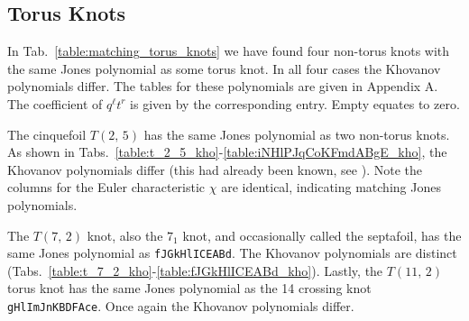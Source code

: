 \documentclass{article}
\theoremstyle{plain}
\begin{document}
        \subsection{Torus Knots}
        \begin{table}[H]
            \centering
            \caption{Knots whose Jones polynomial matches that of a Torus Knot}
            \label{table:matching_torus_knots}
        \end{table}
        In Tab.~\ref{table:matching_torus_knots}
        we have found four non-torus knots with the same
        Jones polynomial as some torus knot. In all four cases the Khovanov
        polynomials differ. The tables for these polynomials are given
        in Appendix A.
        The coefficient of $q^{\ell}t^{r}$ is given by the corresponding entry.
        Empty equates to zero.
        \par\hfill\par
        The cinquefoil $T(2,\,5)$ has the same Jones polynomial as two
        non-torus knots. As shown in
        Tabs.~\ref{table:t_2_5_kho}-\ref{table:iNHlPJqCoKFmdABgE_kho}, the
        Khovanov polynomials differ
        (this had already been known, see \cite{KatlasKhoHo}).
        Note the columns for the Euler characteristic $\chi$ are identical,
        indicating matching Jones polynomials.
        \par\hfill\par
        The $T(7,\,2)$ knot, also the $7_{1}$ knot, and occasionally called the
        septafoil, has the same Jones polynomial as \texttt{fJGkHlICEABd}. The
        Khovanov polynomials are distinct
        (Tabs.~\ref{table:t_7_2_kho}-\ref{table:fJGkHlICEABd_kho}).
        Lastly, the $T(11,\,2)$ torus knot has the same Jones polynomial as the
        14 crossing knot \texttt{gHlImJnKBDFAce}. Once again the Khovanov
        polynomials differ.
\end{document}

